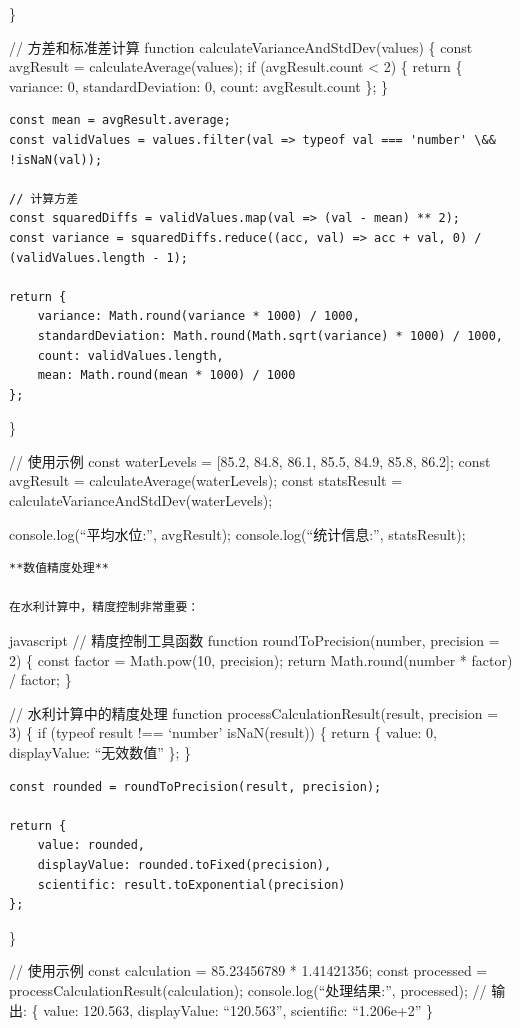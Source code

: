 \}

// 方差和标准差计算 function calculateVarianceAndStdDev(values) \{ const avgResult = calculateAverage(values); if (avgResult.count \textless{} 2) \{ return \{ variance: 0, standardDeviation: 0, count: avgResult.count \}; \}

\begin{verbatim}
const mean = avgResult.average;
const validValues = values.filter(val => typeof val === 'number' \&& !isNaN(val));

// 计算方差
const squaredDiffs = validValues.map(val => (val - mean) ** 2);
const variance = squaredDiffs.reduce((acc, val) => acc + val, 0) / (validValues.length - 1);

return {
    variance: Math.round(variance * 1000) / 1000,
    standardDeviation: Math.round(Math.sqrt(variance) * 1000) / 1000,
    count: validValues.length,
    mean: Math.round(mean * 1000) / 1000
};
\end{verbatim}

\}

// 使用示例 const waterLevels = {[}85.2, 84.8, 86.1, 85.5, 84.9, 85.8, 86.2{]}; const avgResult = calculateAverage(waterLevels); const statsResult = calculateVarianceAndStdDev(waterLevels);

console.log(``平均水位:'', avgResult); console.log(``统计信息:'', statsResult);

\begin{lstlisting}
**数值精度处理**

在水利计算中，精度控制非常重要：
\end{lstlisting}

javascript // 精度控制工具函数 function roundToPrecision(number, precision = 2) \{ const factor = Math.pow(10, precision); return Math.round(number * factor) / factor; \}

// 水利计算中的精度处理 function processCalculationResult(result, precision = 3) \{ if (typeof result !== `number' \textbar\textbar{} isNaN(result)) \{ return \{ value: 0, displayValue: ``无效数值'' \}; \}

\begin{verbatim}
const rounded = roundToPrecision(result, precision);

return {
    value: rounded,
    displayValue: rounded.toFixed(precision),
    scientific: result.toExponential(precision)
};
\end{verbatim}

\}

// 使用示例 const calculation = 85.23456789 * 1.41421356; const processed = processCalculationResult(calculation); console.log(``处理结果:'', processed); // 输出: \{ value: 120.563, displayValue: ``120.563'', scientific: ``1.206e+2'' \}

